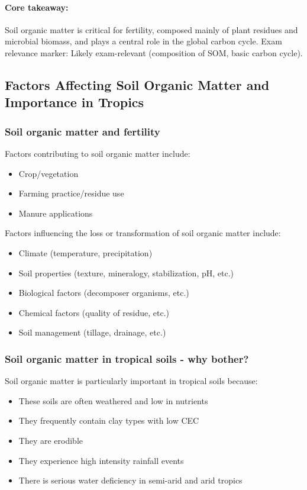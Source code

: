 \paragraph*{Core takeaway:} 
Soil organic matter is critical for fertility, composed mainly of plant residues and microbial biomass, and plays a central role in the global carbon cycle. Exam relevance marker: Likely exam-relevant (composition of SOM, basic carbon cycle).

\subsection{Factors Affecting Soil Organic Matter and Importance in Tropics} 
\subsubsection{Soil organic matter and fertility}  
Factors contributing to soil organic matter include: 

\begin{itemize} 
    \item Crop/vegetation 
    \item Farming practice/residue use 
    \item Manure applications 
\end{itemize}

Factors influencing the loss or transformation of soil organic matter include: 

\begin{itemize} 
    \item Climate (temperature, precipitation) 
    \item Soil properties (texture, mineralogy, stabilization, pH, etc.) 
    \item Biological factors (decomposer organisms, etc.) 
    \item Chemical factors (quality of residue, etc.) 
    \item Soil management (tillage, drainage, etc.) 
\end{itemize}

\subsubsection{Soil organic matter in tropical soils - why bother?} Soil organic matter is particularly important in tropical soils because: 

\begin{itemize} 
    \item These soils are often weathered and low in nutrients 
    \item They frequently contain clay types with low CEC \item They are erodible 
    \item They experience high intensity rainfall events 
    \item There is serious water deficiency in semi-arid and arid tropics 
\end{itemize}

